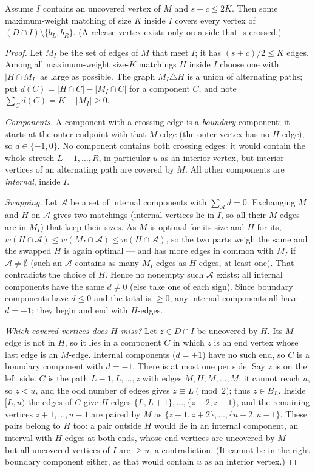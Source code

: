 \documentclass[11pt]{article}
\begin{document}
\begin{theorembox}
Assume $I$ contains an uncovered vertex of $M$ and $s+c\le 2K$. Then some
maximum-weight matching of size $K$ inside $I$ covers every vertex of
$(D\cap I)\setminus\{b_L,b_R\}$. (A release vertex exists only on a side that
is crossed.)
\end{theorembox}
\begin{proof}
Let $M_I$ be the set of edges of $M$ that meet $I$; it has
$(s+c)/2\le K$ edges. Among all maximum-weight size-$K$ matchings $H$ inside
$I$ choose one with $|H\cap M_I|$ as large as possible. The graph
$M_I\triangle H$ is a union of alternating paths; put
$d(C)=|H\cap C|-|M_I\cap C|$ for a component $C$, and note
$\sum_Cd(C)=K-|M_I|\ge0$.

\emph{Components.} A component with a crossing edge is a \emph{boundary}
component; it starts at the outer endpoint with that $M$-edge (the outer
vertex has no $H$-edge), so $d\in\{-1,0\}$. No component contains both
crossing edges: it would contain the whole stretch $L-1,\dots,R$, in
particular $u$ as an interior vertex, but interior vertices of an alternating
path are covered by $M$. All other components are \emph{internal}, inside $I$.

\emph{Swapping.} Let $\mathcal A$ be a set of internal components with
$\sum_{\mathcal A}d=0$. Exchanging $M$ and $H$ on $\mathcal A$ gives two
matchings (internal vertices lie in $I$, so all their $M$-edges are in
$M_I$) that keep their sizes. As $M$ is optimal for its size and $H$ for its,
$w(H\cap\mathcal A)\le w(M_I\cap\mathcal A)\le w(H\cap\mathcal A)$, so the
two parts weigh the same and the swapped $H$ is again optimal --- and has more
edges in common with $M_I$ if $\mathcal A\ne\emptyset$ (such an $\mathcal A$
contains as many $M_I$-edges as $H$-edges, at least one). That contradicts
the choice of $H$. Hence no nonempty such $\mathcal A$ exists: all internal
components have the same $d\ne0$ (else take one of each sign). Since
boundary components have $d\le0$ and the total is $\ge0$, any internal
components all have $d=+1$; they begin and end with $H$-edges.

\emph{Which covered vertices does $H$ miss?} Let $z\in D\cap I$ be uncovered
by $H$. Its $M$-edge is not in $H$, so it lies in a component $C$ in which $z$
is an end vertex whose last edge is an $M$-edge. Internal components
($d=+1$) have no such end, so $C$ is a boundary component with $d=-1$.
There is at most one per side. Say $z$ is on the left side. $C$ is the path
$L-1,L,\dots,z$ with edges $M,H,M,\dots,M$; it cannot reach $u$, so
$z<u$, and the odd number of edges gives $z\equiv L\pmod2$; thus $z\in B_L$.
Inside $[L,u)$ the edges of $C$ give $H$-edges $\{L,L+1\},\dots,\{z-2,z-1\}$,
and the remaining vertices $z+1,\dots,u-1$ are paired by $M$ as
$\{z+1,z+2\},\dots,\{u-2,u-1\}$. These pairs belong to $H$ too: a pair
outside $H$ would lie in an internal component, an interval
with $H$-edges at both ends, whose end vertices are uncovered by $M$ --- but
all uncovered vertices of $I$ are $\ge u$, a contradiction.
(It cannot be in the right boundary component either, as that would contain
$u$ as an interior vertex.)


\end{proof}
\end{document}
